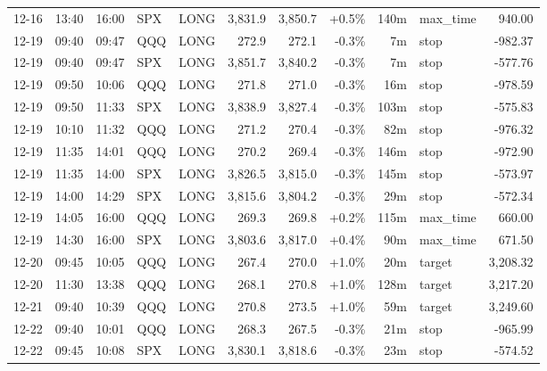 \documentclass[11pt,a4paper,twoside]{article}
\begin{document}
\begin{center}
\begin{longtable}{>{\color{txtmain}}l l l l l r r r r >{\color{txtmain}}l r}
12-16 & 13:40 & 16:00 & SPX & LONG & 3,831.9 & 3,850.7 & \textcolor{wingreen}{+0.5\%} & 140m & max\_time & \textcolor{wingreen}{940.00} \\
12-19 & 09:40 & 09:47 & QQQ & LONG & 272.9 & 272.1 & \textcolor{lossred}{-0.3\%} & 7m & stop & \textcolor{lossred}{-982.37} \\
12-19 & 09:40 & 09:47 & SPX & LONG & 3,851.7 & 3,840.2 & \textcolor{lossred}{-0.3\%} & 7m & stop & \textcolor{lossred}{-577.76} \\
12-19 & 09:50 & 10:06 & QQQ & LONG & 271.8 & 271.0 & \textcolor{lossred}{-0.3\%} & 16m & stop & \textcolor{lossred}{-978.59} \\
12-19 & 09:50 & 11:33 & SPX & LONG & 3,838.9 & 3,827.4 & \textcolor{lossred}{-0.3\%} & 103m & stop & \textcolor{lossred}{-575.83} \\
12-19 & 10:10 & 11:32 & QQQ & LONG & 271.2 & 270.4 & \textcolor{lossred}{-0.3\%} & 82m & stop & \textcolor{lossred}{-976.32} \\
12-19 & 11:35 & 14:01 & QQQ & LONG & 270.2 & 269.4 & \textcolor{lossred}{-0.3\%} & 146m & stop & \textcolor{lossred}{-972.90} \\
12-19 & 11:35 & 14:00 & SPX & LONG & 3,826.5 & 3,815.0 & \textcolor{lossred}{-0.3\%} & 145m & stop & \textcolor{lossred}{-573.97} \\
12-19 & 14:00 & 14:29 & SPX & LONG & 3,815.6 & 3,804.2 & \textcolor{lossred}{-0.3\%} & 29m & stop & \textcolor{lossred}{-572.34} \\
12-19 & 14:05 & 16:00 & QQQ & LONG & 269.3 & 269.8 & \textcolor{wingreen}{+0.2\%} & 115m & max\_time & \textcolor{wingreen}{660.00} \\
12-19 & 14:30 & 16:00 & SPX & LONG & 3,803.6 & 3,817.0 & \textcolor{wingreen}{+0.4\%} & 90m & max\_time & \textcolor{wingreen}{671.50} \\
12-20 & 09:45 & 10:05 & QQQ & LONG & 267.4 & 270.0 & \textcolor{wingreen}{+1.0\%} & 20m & target & \textcolor{wingreen}{3,208.32} \\
12-20 & 11:30 & 13:38 & QQQ & LONG & 268.1 & 270.8 & \textcolor{wingreen}{+1.0\%} & 128m & target & \textcolor{wingreen}{3,217.20} \\
12-21 & 09:40 & 10:39 & QQQ & LONG & 270.8 & 273.5 & \textcolor{wingreen}{+1.0\%} & 59m & target & \textcolor{wingreen}{3,249.60} \\
12-22 & 09:40 & 10:01 & QQQ & LONG & 268.3 & 267.5 & \textcolor{lossred}{-0.3\%} & 21m & stop & \textcolor{lossred}{-965.99} \\
12-22 & 09:45 & 10:08 & SPX & LONG & 3,830.1 & 3,818.6 & \textcolor{lossred}{-0.3\%} & 23m & stop & \textcolor{lossred}{-574.52} \\

\end{longtable}
\end{center}
\end{document}
